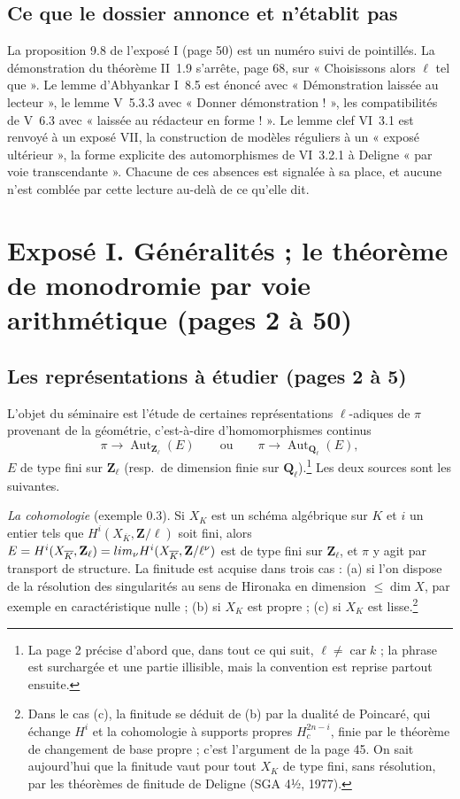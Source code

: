 \documentclass[11pt,a4paper]{article}
\begin{document}
\subsection*{Ce que le dossier annonce et n'établit pas}

La proposition 9.8 de l'exposé I (page 50) est un numéro suivi de pointillés.
La démonstration du théorème II~1.9 s'arrête, page 68, sur « Choisissons alors
$\ell$ tel que ». Le lemme d'Abhyankar I~8.5 est énoncé avec « Démonstration
laissée au lecteur », le lemme V~5.3.3 avec « Donner démonstration ! », les
compatibilités de V~6.3 avec « laissée au rédacteur en forme ! ». Le lemme clef
VI~3.1 est renvoyé à un exposé VII, la construction de modèles réguliers à un
« exposé ultérieur », la forme explicite des automorphismes de VI~3.2.1 à
Deligne « par voie transcendante ». Chacune de ces absences est signalée à sa
place, et aucune n'est comblée par cette lecture au-delà de ce qu'elle dit.

\section*{Exposé I. Généralités ; le théorème de monodromie par voie arithmétique (pages 2 à 50)}

\subsection*{Les représentations à étudier (pages 2 à 5)}

L'objet du séminaire est l'étude de certaines représentations $\ell$-adiques de
$\pi$ provenant de la géométrie, c'est-à-dire d'homomorphismes continus
\[
  \pi \longrightarrow \operatorname{Aut}_{\mathbf{Z}_\ell}(E)
  \qquad\text{ou}\qquad
  \pi \longrightarrow \operatorname{Aut}_{\mathbf{Q}_\ell}(E),
\]
$E$ de type fini sur $\mathbf{Z}_\ell$ (resp.\ de dimension finie sur
$\mathbf{Q}_\ell$).\footnote{La page 2 précise d'abord que, dans tout ce qui
suit, $\ell \neq \operatorname{car} k$ ; la phrase est surchargée et une partie
illisible, mais la convention est reprise partout ensuite.} Les deux sources sont
les suivantes.

\emph{La cohomologie} (exemple 0.3). Si $X_K$ est un schéma algébrique sur $K$
et $i$ un entier tels que $H^i(X_{\overline K}, \mathbf{Z}/\ell)$ soit fini, alors
$E = H^i(X_{\overline K}, \mathbf{Z}_\ell) = \varprojlim_\nu
H^i(X_{\overline K}, \mathbf{Z}/\ell^\nu)$ est de type fini sur
$\mathbf{Z}_\ell$, et $\pi$ y agit par transport de structure. La finitude est
acquise dans trois cas : (a) si l'on dispose de la résolution des singularités
au sens de Hironaka en dimension $\leq \dim X$, par exemple en caractéristique
nulle ; (b) si $X_K$ est propre ; (c) si $X_K$ est lisse.\footnote{Dans le cas
(c), la finitude se déduit de (b) par la dualité de Poincaré, qui échange
$H^i$ et la cohomologie à supports propres $H^{2n-i}_c$, finie par le
théorème de changement de base propre ; c'est l'argument de la page 45. On
sait aujourd'hui que la finitude vaut pour tout $X_K$ de type fini, sans
résolution, par les théorèmes de finitude de Deligne (SGA 4½, 1977).}
\end{document}
